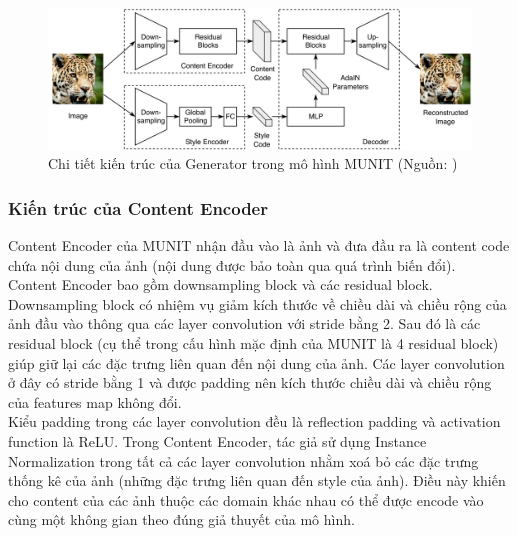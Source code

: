 {    \begin{figure}[H]
    \centering
    \includegraphics[width=13cm] {images/detail_munit.png}
    \caption{Chi tiết kiến trúc của Generator trong mô hình MUNIT (Nguồn: \cite{munit})}
    \label{fig:detail_munit}
    \end{figure}
    
    \subsubsection{Kiến trúc của Content Encoder}
    Content Encoder của MUNIT nhận đầu vào là ảnh và đưa đầu ra là content code chứa nội dung của ảnh (nội dung được bảo toàn qua quá trình biến đổi).\\
    Content Encoder bao gồm downsampling block và các residual block. Downsampling block có nhiệm vụ giảm kích thước về chiều dài và chiều rộng của ảnh đầu vào thông qua các layer convolution với stride bằng 2. Sau đó là các residual block (cụ thể trong cấu hình mặc định của MUNIT là 4 residual block) giúp giữ lại các đặc trưng liên quan đến nội dung của ảnh. Các layer convolution ở đây có stride bằng 1 và được padding nên kích thước chiều dài và chiều rộng của features map không đổi.\\
    Kiểu padding trong các layer convolution đều là reflection padding và activation function là ReLU. Trong Content Encoder, tác giả sử dụng Instance Normalization \cite{in} trong tất cả các layer convolution nhằm xoá bỏ các đặc trưng thống kê của ảnh (những đặc trưng liên quan đến style của ảnh). Điều này khiến cho content của các ảnh thuộc các domain khác nhau có thể được encode vào cùng một không gian theo đúng giả thuyết của mô hình.
    
}
